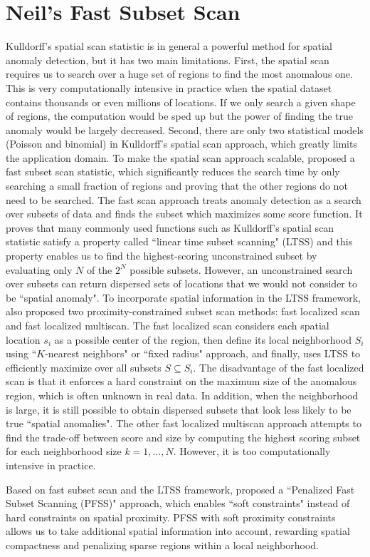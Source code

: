 \documentclass[11pt]{article}
\begin{document}
\section{Neil's Fast Subset Scan}
Kulldorff's spatial scan statistic is in general a powerful method for spatial anomaly detection, but it has two main limitations. First, the spatial scan requires us to search over a huge set of regions to find the most anomalous one. This is very computationally intensive in practice when the spatial dataset contains thousands or even millions of locations. If we only search a given shape of regions, the computation would be sped up but the power of finding the true anomaly would be largely decreased. Second, there are only two statistical models (Poisson and binomial) in Kulldorff's spatial scan approach, which greatly limits the application domain. To make the spatial scan approach scalable, \citet{neill2012fast} proposed a fast subset scan statistic, which significantly reduces the search time by only searching a small fraction of regions and proving that the other regions do not need to be searched. The fast scan approach treats anomaly detection as a search over subsets of data and finds the subset which maximizes some score function. It proves that many commonly used functions such as Kulldorff's spatial scan statistic satisfy a property called ``linear time subset scanning" (LTSS) and this property enables us to find the highest-scoring unconstrained subset by evaluating only $N$ of the $2^N$ possible subsets. However, an unconstrained search over subsets can return dispersed sets of locations that we would not consider to be ``spatial anomaly". To incorporate spatial information in the LTSS framework, \citet{neill2012fast} also proposed two proximity-constrained subset scan methods: fast localized scan and fast localized multiscan. The fast localized scan considers each spatial location $s_i$ as a possible center of the region, then define its local neighborhood $S_i$ using ``$K$-nearest neighbors" or ``fixed radius" approach, and finally, uses LTSS to efficiently maximize over all subsets $S\subseteq S_i$. The disadvantage of the fast localized scan is that it enforces a hard constraint on the maximum size of the anomalous region, which is often unknown in real data. In addition, when the neighborhood is large, it is still possible to obtain dispersed subsets that look less likely to be true ``spatial anomalies". The other fast localized multiscan approach attempts to find the trade-off between score and size by computing the highest scoring subset for each neighborhood size $k=1,\ldots, N$. However, it is too computationally intensive in practice. 

Based on fast subset scan and the LTSS framework,\citet{speakman2016penalized} proposed a ``Penalized Fast Subset Scanning (PFSS)" approach, which enables ``soft constraints" instead of hard constraints on spatial proximity. PFSS with soft proximity constraints allows us to take additional spatial information into account, rewarding spatial compactness and penalizing sparse regions within a local neighborhood.
\end{document}
